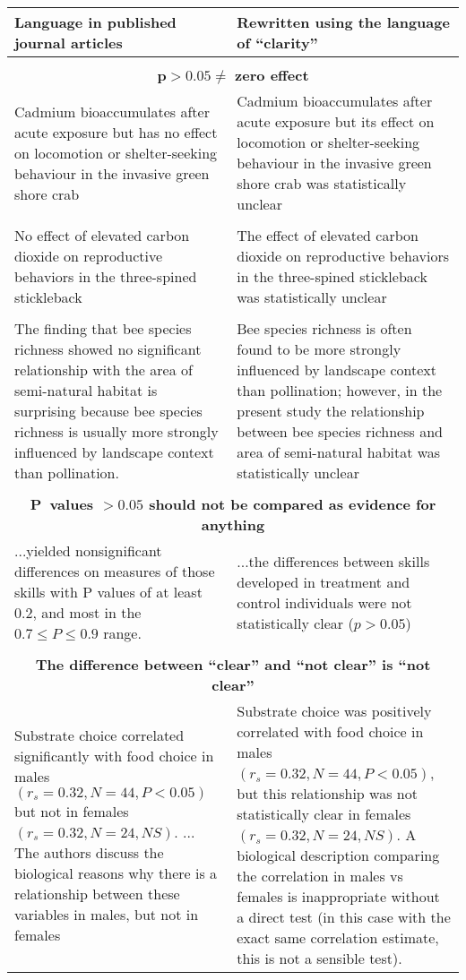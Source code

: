 \begin{framed}
\begin{tabular}{p{7.5cm}p{7.5cm}}
     Language in published journal articles & Rewritten using the language of ``clarity'' \\
     	\hline
        \\
     \multicolumn{2}{c}{$\mathbf{p > 0.05 \neq}$ \textbf{zero effect}} \\
        Cadmium bioaccumulates after acute exposure but has no effect on locomotion or shelter-seeking behaviour in the
        invasive green shore crab & Cadmium bioaccumulates after acute exposure but its effect on locomotion or shelter-seeking 
        behaviour in the invasive green shore crab was statistically unclear \\ 
        \\
        No effect of elevated carbon dioxide on reproductive behaviors in the three-spined stickleback & The effect of elevated 
        carbon dioxide on reproductive behaviors in the three-spined stickleback was statistically unclear \\
        \\
        The finding that bee species richness showed no significant relationship with the area of semi-natural habitat is 
        surprising because bee species richness is usually more strongly influenced by landscape context than pollination. & 
        Bee species richness is often found to be more strongly influenced by landscape context than pollination; however, 
        in the present study the relationship between bee species richness and area of semi-natural habitat was statistically 
        unclear \\ 
        \\
     \multicolumn{2}{c}{\textbf{P~values $\mathbf{> 0.05}$ should not be compared as evidence for anything}} \\
        ...yielded nonsignificant differences on measures of those skills with P values of at least 0.2, and most in the
        $0.7 \leq P \leq 0.9$ range. & ...the differences between skills developed in treatment and control individuals
        were not statistically clear ($p > 0.05$) \\
        \\
     \multicolumn{2}{c}{\textbf{The difference between ``clear'' and ``not clear'' is ``not clear''}} \\
        Substrate choice correlated significantly with food choice in males $(r_{s} = 0.32, N = 44, P < 0.05)$ but not in
        females $(r_{s} = 0.32, N = 24, NS)$. ... The authors discuss the biological reasons why there is a relationship 
        between these variables in males, but not in females & Substrate choice was positively correlated with food choice in 
        males $(r_{s} = 0.32, N = 44, P < 0.05)$, but this relationship was not statistically clear in females $(r_{s} = 0.32,
        N = 24, NS)$. A biological description comparing the correlation in males vs females is inappropriate without a direct
        test (in this case with the exact same correlation estimate, this is not a sensible test). \\
\end{tabular}
\end{framed}
